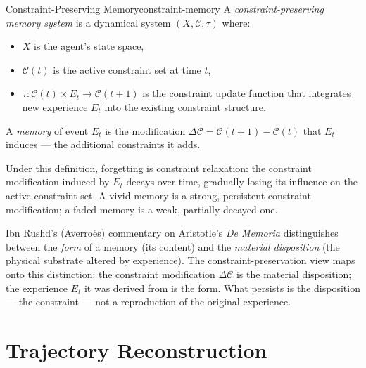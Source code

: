 \begin{definition}{Constraint-Preserving Memory}{constraint-memory}
  A \emph{constraint-preserving memory system} is a dynamical system
  $(X, \mathcal{C}, \tau)$ where:
  \begin{itemize}
    \item $X$ is the agent's state space,
    \item $\mathcal{C}(t)$ is the active constraint set at time $t$,
    \item $\tau : \mathcal{C}(t) \times E_t \to \mathcal{C}(t+1)$
          is the constraint update function that integrates new experience
          $E_t$ into the existing constraint structure.
  \end{itemize}
  A \emph{memory} of event $E_t$ is the modification
  $\Delta\mathcal{C} = \mathcal{C}(t+1) - \mathcal{C}(t)$ that $E_t$
  induces — the additional constraints it adds.
\end{definition}

Under this definition, forgetting is constraint relaxation: the constraint
modification induced by $E_t$ decays over time, gradually losing its
influence on the active constraint set. A vivid memory is a strong,
persistent constraint modification; a faded memory is a weak, partially
decayed one.

\begin{historynote}
  Ibn Rushd's (Averroës) commentary on Aristotle's \textit{De Memoria}
  distinguishes between the \emph{form} of a memory (its content) and
  the \emph{material disposition} (the physical substrate altered by
  experience). The constraint-preservation view maps onto this distinction:
  the constraint modification $\Delta\mathcal{C}$ is the material
  disposition; the experience $E_t$ it was derived from is the form.
  What persists is the disposition — the constraint — not a reproduction
  of the original experience.
\end{historynote}

\section{Trajectory Reconstruction}

